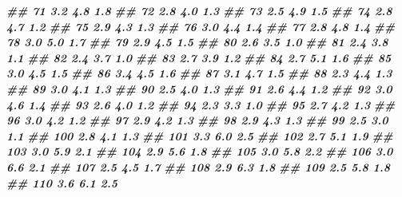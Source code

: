 \documentclass[
]{book}
\newenvironment{Shaded}{\begin{snugshade}}{\end{snugshade}}
\newcommand{\DocumentationTok}[1]{\textcolor[rgb]{0.56,0.35,0.01}{\textbf{\textit{#1}}}}
\begin{document}
\begin{Shaded}
\begin{Highlighting}[]
\DocumentationTok{\#\# 71          3.2          4.8         1.8}
\DocumentationTok{\#\# 72          2.8          4.0         1.3}
\DocumentationTok{\#\# 73          2.5          4.9         1.5}
\DocumentationTok{\#\# 74          2.8          4.7         1.2}
\DocumentationTok{\#\# 75          2.9          4.3         1.3}
\DocumentationTok{\#\# 76          3.0          4.4         1.4}
\DocumentationTok{\#\# 77          2.8          4.8         1.4}
\DocumentationTok{\#\# 78          3.0          5.0         1.7}
\DocumentationTok{\#\# 79          2.9          4.5         1.5}
\DocumentationTok{\#\# 80          2.6          3.5         1.0}
\DocumentationTok{\#\# 81          2.4          3.8         1.1}
\DocumentationTok{\#\# 82          2.4          3.7         1.0}
\DocumentationTok{\#\# 83          2.7          3.9         1.2}
\DocumentationTok{\#\# 84          2.7          5.1         1.6}
\DocumentationTok{\#\# 85          3.0          4.5         1.5}
\DocumentationTok{\#\# 86          3.4          4.5         1.6}
\DocumentationTok{\#\# 87          3.1          4.7         1.5}
\DocumentationTok{\#\# 88          2.3          4.4         1.3}
\DocumentationTok{\#\# 89          3.0          4.1         1.3}
\DocumentationTok{\#\# 90          2.5          4.0         1.3}
\DocumentationTok{\#\# 91          2.6          4.4         1.2}
\DocumentationTok{\#\# 92          3.0          4.6         1.4}
\DocumentationTok{\#\# 93          2.6          4.0         1.2}
\DocumentationTok{\#\# 94          2.3          3.3         1.0}
\DocumentationTok{\#\# 95          2.7          4.2         1.3}
\DocumentationTok{\#\# 96          3.0          4.2         1.2}
\DocumentationTok{\#\# 97          2.9          4.2         1.3}
\DocumentationTok{\#\# 98          2.9          4.3         1.3}
\DocumentationTok{\#\# 99          2.5          3.0         1.1}
\DocumentationTok{\#\# 100         2.8          4.1         1.3}
\DocumentationTok{\#\# 101         3.3          6.0         2.5}
\DocumentationTok{\#\# 102         2.7          5.1         1.9}
\DocumentationTok{\#\# 103         3.0          5.9         2.1}
\DocumentationTok{\#\# 104         2.9          5.6         1.8}
\DocumentationTok{\#\# 105         3.0          5.8         2.2}
\DocumentationTok{\#\# 106         3.0          6.6         2.1}
\DocumentationTok{\#\# 107         2.5          4.5         1.7}
\DocumentationTok{\#\# 108         2.9          6.3         1.8}
\DocumentationTok{\#\# 109         2.5          5.8         1.8}
\DocumentationTok{\#\# 110         3.6          6.1         2.5}

\end{Highlighting}
\end{Shaded}
\end{document}

